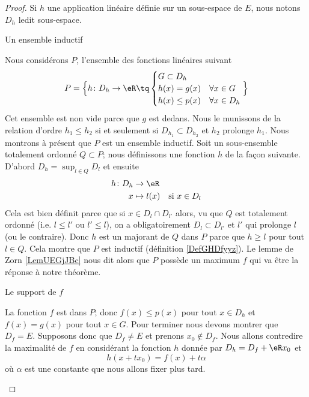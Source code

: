 \begin{proof}
    Si \( h\) une application linéaire définie sur un sous-espace de \( E\), nous notons \( D_h\) ledit sous-espace. 
    
    \begin{subproof}
    \item[Un ensemble inductif]

        Nous considérons \( P\), l'ensemble des fonctions linéaires suivant 
        \begin{equation}
            P=\Big\{  h\colon D_h\to \eR\tq
            \begin{cases}
                G\subset D_h\\
                h(x)=g(x)&\forall x\in G\\
                h(x)\leq p(x)&\forall x\in D_h
            \end{cases}
        \Big\}
        \end{equation}
        Cet ensemble est non vide parce que \( g\) est dedans. Nous le munissons de la relation d'ordre \( h_1\leq h_2\) si et seulement si \( D_{h_1}\subset D_{h_2}\) et \( h_2\) prolonge \( h_1\). Nous montrons à présent que \( P\) est un ensemble inductif. Soit un sous-ensemble totalement ordonné \( Q\subset P\); nous définissons une fonction \( h\) de la façon suivante. D'abord \( D_h=\sup_{l\in Q}D_l\) et ensuite
        \begin{equation}
            \begin{aligned}
                h\colon D_h&\to \eR \\
                x&\mapsto l(x)&\text{si } x\in D_l
            \end{aligned}
        \end{equation}
        Cela est bien définit parce que si \( x\in D_l\cap D_{l'}\) alors, vu que \( Q\) est totalement ordonné (i.e. \( l\leq l'\) ou \( l'\leq l\)), on a obligatoirement \( D_l\subset D_{l'}\) et \( l'\) qui prolonge \( l\) (ou le contraire). Donc \( h\) est un majorant de \( Q\) dans \( P\) parce que \( h\geq l\) pour tout \( l\in Q\). Cela montre que \( P\) est inductif (définition \ref{DefGHDfyyz}). Le lemme de Zorn \ref{LemUEGjJBc} nous dit alors que \( P\) possède un maximum \( f\) qui va être la réponse à notre théorème.

    \item[Le support de \( f\)]

        La fonction \( f\) est dans \( P\); donc \( f(x)\leq p(x)\) pour tout \( x\in D_h\) et \( f(x)=g(x)\) pour tout \( x\in G\). Pour terminer nous devons montrer que \( D_f=E\). Supposons donc que \( D_f\neq E\) et prenons \( x_0\notin D_f\). Nous allons contredire la maximalité de \( f\) en considérant la fonction \( h\) donnée par \( D_h=D_f+\eR x_0 \) et
        \begin{equation}
            h(x+tx_0)=f(x)+t\alpha
        \end{equation}
        où \( \alpha\) est une constante que nous allons fixer plus tard.


\end{subproof}
\end{proof}
